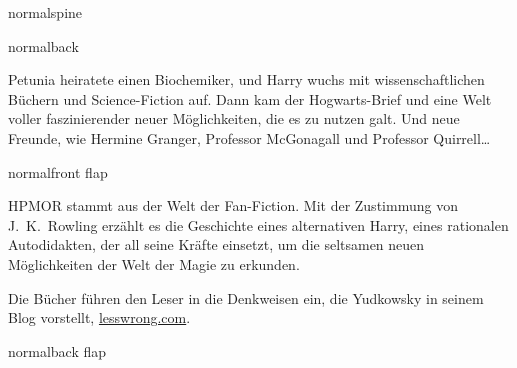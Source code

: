 \documentclass[12pt,coverwidth=\the\hpcoverwidth,coverheight=\the\hpcoverheight,spinewidth=\the\hpspinewidth,marklength=0mm,bleedwidth=5mm,flapwidth=63mm,german]{bookcover}
\begin{document}
\begin{bookcover}

\begin{bookcoverelement}{normal}{spine}
\centering
\color{white}\scshape
\vspace{0.5cm}\huge \volumenumber\\[2ex]\Large
\vfill
{}
\vfill
\end{bookcoverelement}

\begin{bookcoverelement}{normal}{back}
  \centering
  \vspace{20mm}
  \parbox{110mm}{\color{white}\Large\raggedright
Petunia heiratete einen Biochemiker, und Harry wuchs mit wissenschaftlichen Büchern und Science-Fiction auf. Dann kam der Hogwarts-Brief und eine Welt voller faszinierender neuer Möglichkeiten, die es zu nutzen galt. Und neue Freunde, wie Hermine Granger, Professor McGonagall und Professor Quirrell…
}
\end{bookcoverelement}

\begin{bookcoverelement}{normal}{front flap}
\centering
\vspace{20mm}
\parbox{40mm}{\color{white}\raggedright\small
HPMOR stammt aus der Welt der Fan-Fiction. Mit der Zustimmung von J.~K.~Rowling erzählt es die Geschichte eines alternativen Harry, eines rationalen Autodidakten, der all seine Kräfte einsetzt, um die seltsamen neuen Möglichkeiten der Welt der Magie zu erkunden.

\bigskip Die Bücher führen den Leser in die Denkweisen ein, die Yudkowsky in seinem Blog vorstellt, \url{lesswrong.com}.}
\end{bookcoverelement}

\begin{bookcoverelement}{normal}{back flap}
\centering
\vspace{20mm}
\parbox{40mm}{\color{white}\small\raggedright
}
\end{bookcoverelement}

\end{bookcover}
\end{document}
